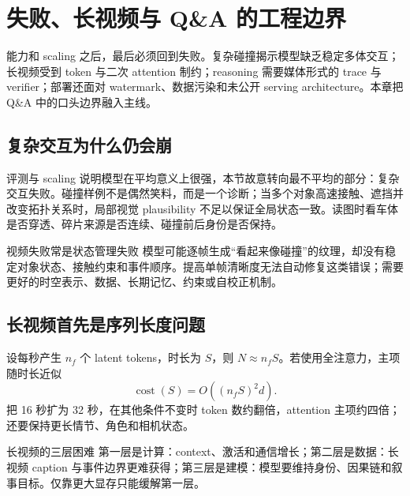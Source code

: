 \section{失败、长视频与 Q\&A 的工程边界}

能力和 scaling 之后，最后必须回到失败。复杂碰撞揭示模型缺乏稳定多体交互；长视频受到 token 与二次 attention 制约；reasoning 需要媒体形式的 trace 与 verifier；部署还面对 watermark、数据污染和未公开 serving architecture。本章把 Q\&A 中的口头边界融入主线。

\subsection{复杂交互为什么仍会崩}

评测与 scaling 说明模型在平均意义上很强，本节故意转向最不平均的部分：复杂交互失败。碰撞样例不是偶然笑料，而是一个诊断；当多个对象高速接触、遮挡并改变拓扑关系时，局部视觉 plausibility 不足以保证全局状态一致。读图时看车体是否穿透、碎片来源是否连续、碰撞前后身份是否保持。


\begin{warningbox}{视频失败常是状态管理失败}
模型可能逐帧生成“看起来像碰撞”的纹理，却没有稳定对象状态、接触约束和事件顺序。提高单帧清晰度无法自动修复这类错误；需要更好的时空表示、数据、长期记忆、约束或自校正机制。
\end{warningbox}

\subsection{长视频首先是序列长度问题}

设每秒产生 $n_f$ 个 latent tokens，时长为 $S$，则 $N\approx n_fS$。若使用全注意力，主项随时长近似
\[
\operatorname{cost}(S)=O((n_fS)^2d).
\]
把 16 秒扩为 32 秒，在其他条件不变时 token 数约翻倍，attention 主项约四倍；还要保持更长情节、角色和相机状态。

\begin{knowledgebox}{长视频的三层困难}
第一层是计算：context、激活和通信增长；第二层是数据：长视频 caption 与事件边界更难获得；第三层是建模：模型要维持身份、因果链和叙事目标。仅靠更大显存只能缓解第一层。
\end{knowledgebox}


